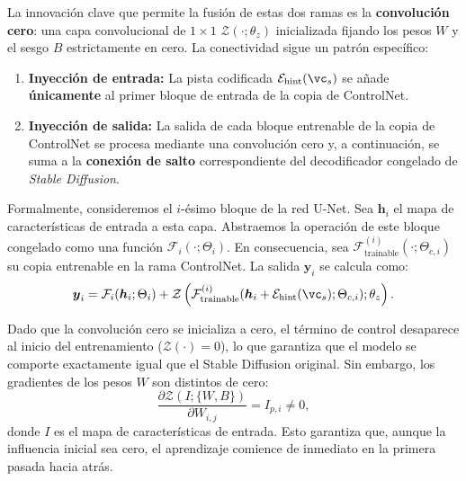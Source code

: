 \documentclass[../../book-main_es.tex]{subfiles}
\begin{document}
La innovación clave que permite la fusión de estas dos ramas es la 
\textbf{convolución cero}: una capa convolucional de $1 \times 1$ $\mathcal{Z}(\cdot; \theta_z)$ 
inicializada fijando los pesos $W$ y el sesgo $B$ estrictamente en cero. La conectividad sigue 
un patrón específico:
\begin{enumerate}
    \item \textbf{Inyección de entrada:} La pista codificada $\mathcal{E}_{\text{hint}}(\vc_s)$ se añade \textbf{únicamente} al primer bloque de entrada de la copia de ControlNet.
    \item \textbf{Inyección de salida:} La salida de cada bloque entrenable de la copia de ControlNet se procesa mediante una convolución cero y, a continuación, se suma a la \textbf{conexión de salto} correspondiente del decodificador congelado de \textit{Stable Diffusion}.
\end{enumerate}

Formalmente, consideremos el $i$-ésimo bloque de la red U-Net. Sea $\boldsymbol{h}_i$ el mapa 
de características de entrada a esta capa. Abstraemos la operación de este bloque congelado 
como una función $\mathcal{F}_i(\cdot; \Theta_i)$. En consecuencia, sea 
$\mathcal{F}_{\text{trainable}}^{(i)}(\cdot; \Theta_{c,i})$ su copia entrenable en la rama 
ControlNet. La salida $\boldsymbol{y}_i$ se calcula como:
\begin{equation}
    \boldsymbol{y}_i = \mathcal{F}_i(\boldsymbol{h}_i; \Theta_i) + \mathcal{Z}\left( \mathcal{F}_{\text{trainable}}^{(i)}(\boldsymbol{h}_i + \mathcal{E}_{\text{hint}}(\vc_s); \Theta_{c,i}); \theta_z \right).
    \label{eq:controlnet}
\end{equation}

Dado que la convolución cero se inicializa a cero, el término de control desaparece al inicio 
del entrenamiento ($\mathcal{Z}(\cdot) = 0$), lo que garantiza que el modelo se comporte 
exactamente igual que el Stable Diffusion original. Sin embargo, los gradientes de los 
pesos $W$ son distintos de cero:
\begin{equation}
    \frac{\partial \mathcal{Z}(I; \{W, B\})}{\partial W_{i,j}} = I_{p,i} \neq 0,
\end{equation}
donde $I$ es el mapa de características de entrada. Esto garantiza que, aunque la influencia 
inicial sea cero, el aprendizaje comience de inmediato en la primera pasada hacia atrás.
\end{document}
